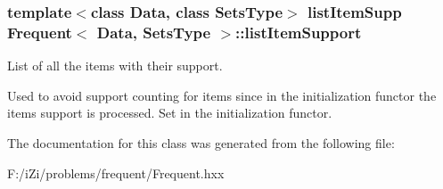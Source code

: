 \subsubsection{\setlength{\rightskip}{0pt plus 5cm}template$<$class Data, class Sets\-Type$>$ list\-Item\-Supp {\bf Frequent}$<$ Data, Sets\-Type $>$::{\bf list\-Item\-Support}}\label{class_frequent_5eee2b41720ffc388e3863f54c62624f}


List of all the items with their support. 

Used to avoid support counting for items since in the initialization functor the items support is processed. Set in the initialization functor. 

The documentation for this class was generated from the following file:\begin{CompactItemize}
\item 
F:/i\-Zi/problems/frequent/Frequent.hxx\end{CompactItemize}
